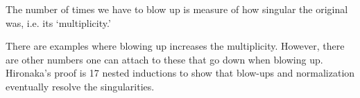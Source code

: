 

The number of times we have to blow up is measure of how singular the original was, i.e. its `multiplicity.' 

There are examples where blowing up increases the multiplicity. However, there are other numbers one can attach to these that go down when blowing up. Hironaka's proof is 17 nested inductions to show that blow-ups and normalization eventually resolve the singularities.  





































